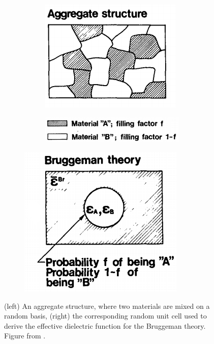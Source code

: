 \begin{figure}
\begin{subfigure}{0.5\textwidth}

    \begin{subfigure}{\textwidth}
        \flushright
        \includegraphics[width=0.7\linewidth]{figures/Ch2/EMA2.png}
    \end{subfigure}
   
    \begin{subfigure}{\textwidth}
        \flushright 
        \includegraphics[width=0.7\linewidth]{figures/Ch2/EMA3.png}
    \end{subfigure}
%
\end{subfigure}
\begin{subfigure}{0.5\textwidth}
    \flushleft
    \includegraphics[width=0.7\linewidth]{figures/Ch2/EMA1.png}
%
\end{subfigure}
\caption{(left) An aggregate structure, where two materials are mixed on a random basis, (right) the corresponding random unit cell used to derive the effective dielectric function for the Bruggeman theory. Figure from \cite{Niklasson_EMAmodels}.}
\label{fig:EMA_bruggeman}
\end{figure}


